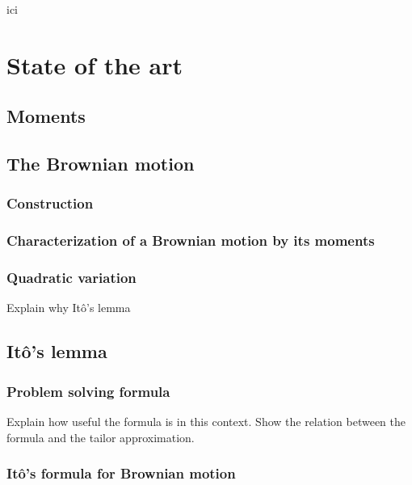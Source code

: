 \documentclass[12pt]{report}
\begin{document}

ici
% 

 
\chapter{State of the art}
\section{Moments}

\section{The Brownian motion}
\subsection{Construction}
\subsection{Characterization of a Brownian motion by its moments}
\subsection{Quadratic variation}
Explain why Itô's lemma


\section{Itô's lemma}
\subsection{Problem solving formula}
Explain how useful the formula is in this context.
Show the relation between the formula and the tailor approximation.
\subsection{Itô's formula for Brownian motion}
\end{document}
